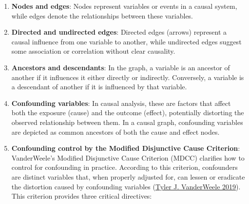 \documentclass[
  singlecolumn]{report}
\begin{document}
\begin{enumerate}
\def\labelenumi{\arabic{enumi}.}
\item
  \textbf{Nodes and edges}: Nodes represent variables or events in a
  causal system, while edges denote the relationships between these
  variables.
\item
  \textbf{Directed and undirected edges}: Directed edges (arrows)
  represent a causal influence from one variable to another, while
  undirected edges suggest some association or correlation without clear
  causality.
\item
  \textbf{Ancestors and descendants}: In the graph, a variable is an
  ancestor of another if it influences it either directly or indirectly.
  Conversely, a variable is a descendant of another if it is influenced
  by that variable.
\item
  \textbf{Confounding variables}: In causal analysis, these are factors
  that affect both the exposure (cause) and the outcome (effect),
  potentially distorting the observed relationship between them. In a
  causal graph, confounding variables are depicted as common ancestors
  of both the cause and effect nodes.
\item
  \textbf{Confounding control by the Modified Disjunctive Cause
  Criterion}: VanderWeele's Modified Disjunctive Cause Criterion (MDCC)
  clarifies how to control for confounding in practice. According to
  this criterion, confounders are distinct variables that, when properly
  adjusted for, can lessen or eradicate the distortion caused by
  confounding variables (\protect\hyperlink{ref-vanderweele2019a}{Tyler
  J. VanderWeele 2019}). This criterion provides three critical
  directives:


\end{enumerate}
\end{document}
